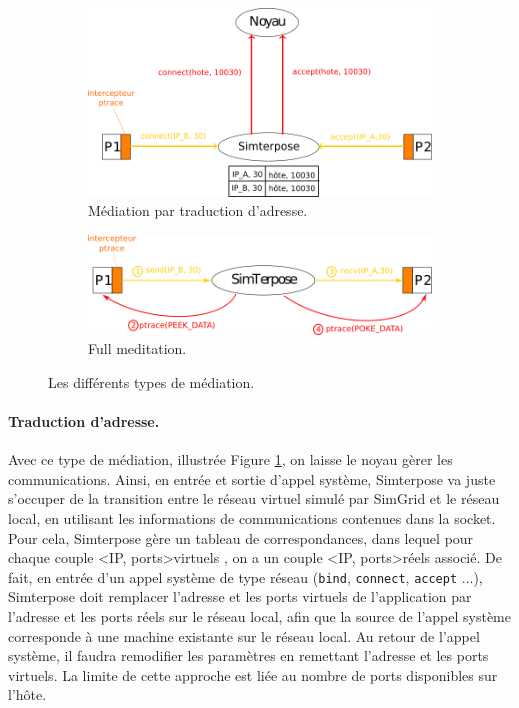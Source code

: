  \begin{figure}[H]
   \centering
   \begin{subfigure}{0.5\textwidth}
   \includegraphics[scale=0.5]{Pictures/png/Mediation_translation_v2}
   \caption{Médiation par traduction d'adresse.}
   \label{ADDRESS_TRANSLATION}
   \end{subfigure}
   \begin{subfigure}{0.4\textwidth}
     \includegraphics[scale=0.5]{Pictures/png/Mediation_full_v2}
  \caption{Full meditation.}
  \label{FULL_MEDIATION}
   \end{subfigure}
   \caption{Les différents types de médiation.}
   \label{MEDIATION}
 \end{figure}
 
\paragraph{Traduction d'adresse.}
 Avec ce type de médiation, illustrée Figure \ref{ADDRESS_TRANSLATION}, on laisse le noyau gèrer les communications. Ainsi, en entrée et sortie d'appel système, Simterpose va juste s'occuper de la transition entre le réseau virtuel simulé
 par SimGrid et le réseau local, en utilisant les informations de communications
 contenues dans la socket. Pour cela, Simterpose gère un tableau de
 correspondances, dans lequel pour chaque couple <IP, ports>virtuels , on a un
 couple <IP, ports>réels associé.  De fait, en entrée d'un appel système de
 type réseau (\texttt{bind}, \texttt{connect}, \texttt{accept} ...), Simterpose
 doit remplacer l'adresse et les ports virtuels de l'application par l'adresse
 et les ports réels sur le réseau local, afin que la source de l'appel système
 corresponde à une machine existante sur le réseau local. Au retour de l'appel
 système, il faudra remodifier les paramètres en remettant l'adresse et les
 ports virtuels. La limite de cette approche est liée au nombre de
 ports disponibles sur l'hôte.

